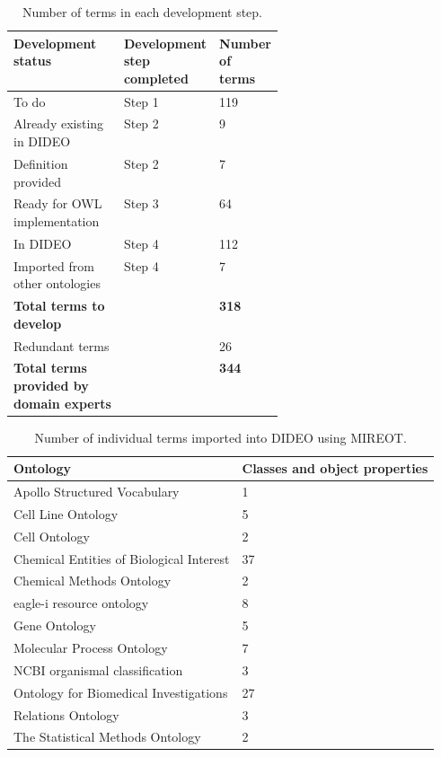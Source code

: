 \documentclass{bmcart}
\begin{document}
\begin{backmatter}
\begin{table}[!h]
\caption{Number of terms in each development step.\label{Tab:02}}
{\begin{tabular}{|l|p{0.2\linewidth}|p{0.15\linewidth}|}\hline
        \textbf{Development status} &
        \textbf{Development step completed} &
        \textbf{Number of terms}\\ \hline
    To do & Step 1 & 119\\ \hline
    Already existing in DIDEO & Step 2 & 9\\ \hline
    Definition provided & Step 2 & 7\\ \hline
    Ready for OWL implementation & Step 3 & 64\\ \hline
    In DIDEO & Step 4 & 112\\ \hline
    Imported from other ontologies & Step 4 & 7\\ \hline
    \textbf{Total terms to develop} & & \textbf{318}\\ \hline
    Redundant terms & & 26\\ \hline
    \textbf{Total terms provided by domain experts} & & \textbf{344}\\ \hline
    \end{tabular}}
    \label{development_steps}
\end{table}

\begin{table}[!h]
    \caption{Number of individual terms imported into DIDEO using MIREOT.\label{Tab:03}}
    {\begin{tabular}{|l|l|}\hline
    \textbf{Ontology} & \textbf{Classes and object properties}\\ \hline

    Apollo Structured Vocabulary & 1\\ \hline
    Cell Line Ontology & 5\\ \hline
    Cell Ontology & 2\\ \hline
    Chemical Entities of Biological Interest & 37\\ \hline
    Chemical Methods Ontology & 2\\ \hline
    eagle-i resource ontology & 8\\ \hline
    Gene Ontology & 5\\ \hline
    Molecular Process Ontology & 7\\ \hline
    NCBI organismal classification & 3\\ \hline
    Ontology for Biomedical Investigations & 27\\ \hline
    Relations Ontology & 3\\ \hline
    The Statistical Methods Ontology & 2\\ \hline
    \end{tabular}}
    \label{import_count}
\end{table}


\end{backmatter}
\end{document}
